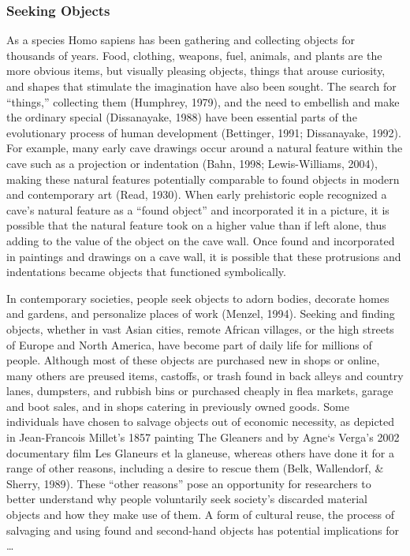 \subsubsection{Seeking Objects}
As a species Homo sapiens has been gathering and collecting objects for thousands of years. Food, clothing, weapons, fuel, animals, and plants are the more obvious items, but visually pleasing objects, things that arouse curiosity, and shapes that stimulate the imagination have also been sought. The search for “things,” collecting them (Humphrey, 1979), and the need to embellish and make the ordinary special (Dissanayake, 1988) have been essential parts of the evolutionary process of human development (Bettinger, 1991; Dissanayake, 1992). For example, many early cave drawings occur around a natural feature within the cave such as a projection or indentation (Bahn, 1998; Lewis-Williams, 2004), making these natural features potentially comparable to found objects in modern and contemporary art (Read, 1930). When early prehistoric eople recognized a cave’s natural feature as a “found object” and incorporated it in a picture, it is possible that the natural feature took on a higher value than if left alone, thus adding to the value of the object on the cave wall. Once found and incorporated in paintings and drawings on a cave wall, it is possible that these protrusions and indentations became objects that functioned symbolically.

In contemporary societies, people seek objects to adorn bodies, decorate homes and gardens, and personalize places of work (Menzel, 1994). Seeking and finding objects, whether in vast Asian cities, remote African villages, or the high streets of Europe and North America, have become part of daily life for millions of people. Although most of these objects are purchased new in shops or online, many others are preused items, castoffs, or trash found in back alleys and country lanes, dumpsters, and rubbish bins or purchased cheaply in flea markets, garage and boot sales, and in shops catering in previously owned goods. Some individuals have chosen to salvage objects out of economic necessity, as depicted in Jean-Francois Millet’s 1857 painting The Gleaners and by Agne`s Verga’s 2002 documentary film Les Glaneurs et la glaneuse, whereas others have done it for a range of other reasons, including a desire to rescue them (Belk, Wallendorf, \& Sherry, 1989). These “other reasons” pose an opportunity for researchers to better understand why people voluntarily seek society’s discarded material objects and how they make use of them. A form of cultural reuse, the process
of salvaging and using found and second-hand objects has potential implications for \ldots 

